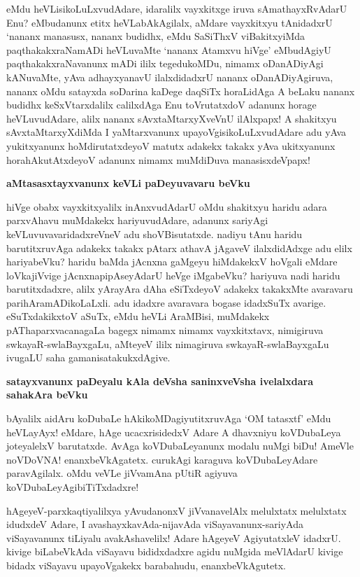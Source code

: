 eMdu heVLisikoLuLxvudAdare, idaralilx vayxkitxge iruva sAmathayxRvAdarU 
Enu? eMbudanunx etitx heVLabAkAgilalx, aMdare vayxkitxyu tAnidadxrU 
`nananx manasusx, nananx budidhx, eMdu SaSiThxV viBakitx\-yiMda 
paqthakakxraNamADi heVLuvaMte `nananx Atamxvu hiVge' eMbudAgiyU 
paqthakakxraNavanunx mADi ililx tegedukoMDu, nimamx oDanADiyAgi 
kANuvaMte, yAva adhayxyanavU ilalxdidadxrU nananx oDanADiyAgiruva, 
nananx oMdu satayxda soDarina kaDege daqSiTx horaLidAga A beLaku nananx budidhx keSxVtarxdalilx calilxdAga Enu toVrutatxdoV adanunx horage heVLuvudAdare, alilx nananx sAvxtaMtarxyXveVnU ilAlxpapx! A \-shakitxyu sAvxtaMtarxyXdiMda I yaMtarxvanunx upayoVgisikoLuLxvudAdare adu yAva yukitxyanunx hoMdirutatxdeyoV matutx adakekx takakx yAva ukitxyanunx horahAkutAtxdeyoV adanunx nimamx muMdiDuva manasisxdeVpapx!

\noindent
\textbf{aMtasasxtayxvanunx keVLi paDeyuvavaru beVku}\label{page108}

hiVge obabx vayxkitxyalilx inAnxvudAdarU oMdu shakitxyu haridu adara 
parxvAhavu muMdakekx hariyuvudAdare, adanunx sariyAgi keVLuvuvavaridadxreVneV adu shoVBisutatxde. nadiyu tAnu haridu barutitxruvAga adakekx takakx pAtarx athavA jAgaveV ilalxdidAdxge adu elilx hariyabeVku? haridu baMda jAcnxna gaMgeyu hiMdakekxV hoVgali eMdare loVkajiVvige jAcnxnapipAseyAdarU heVge iMgabeVku? hariyuva nadi haridu barutitxdadxre, alilx yArayAra dAha eSiTxdeyoV adakekx takakxMte avaravaru parihAramADikoLaLxli. adu idadxre avaravara bogase idadxSuTx avarige. eSuTxdakikxtoV aSuTx, eMdu heVLi AraMBisi, muMdakekx pAThaparxvacanagaLa bagegx nimamx nimamx vayxkitxtavx, nimigiruva swkayaR-swlaBayxgaLu, aMteyeV ililx nimagiruva swkayaR-swlaBayxgaLu ivugaLU saha gamanisatakukxdAgive.

\noindent
\textbf{satayxvanunx paDeyalu kAla deVsha saninxveVsha ivelalxdara sahakAra beVku}\label{page109}

bAyalilx aidAru koDubaLe hAkikoMDagiyutitxruvAga `OM tatasxtf' eMdu heVLayAyx! eMdare, hAge ucacxrisidedxV Adare A dhavxniyu koVDubaLeya joteyalelxV barutatxde. AvAga koVDubaLeyanunx modalu nuMgi biDu! AmeVle noVDoVNA! enanxbeVkAgatetx. curukAgi karaguva koVDubaLeyAdare paravAgilalx. oMdu veVLe jiVvamAna pUtiR agiyuva koVDubaLeyAgibiTiTxdadxre!

hAgeyeV-parxkaqtiyalilxya yAvudanonxV jiVvanavelAlx melulxtatx 
melulxtatx idudxdeV Adare, I avashayxkavAda-nijavAda 
viSayavanunx-sariyAda viSayavanunx tiLiyalu avakAshavelilx! Adare 
hAgeyeV AgiyutatxleV idadxrU. kivige biLabeVkAda viSayavu bididxdadxre 
agidu nuMgida meVlAdarU kivige bidadx viSayavu upayoVgakekx barabahudu, enanxbeVkAgutetx.

